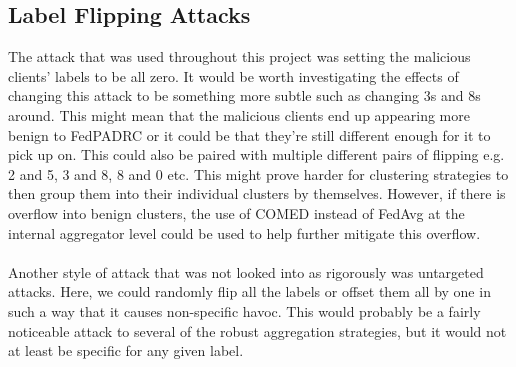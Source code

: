 \subsection{Label Flipping Attacks}
The attack that was used throughout this project was setting the malicious clients' labels to be all zero.
It would be worth investigating the effects of changing this attack to be something more subtle such as changing 3s and 8s around.
This might mean that the malicious clients end up appearing more benign to FedPADRC or it could be that they're still different enough for it to pick up on.
This could also be paired with multiple different pairs of flipping e.g. 2 and 5, 3 and 8, 8 and 0 etc.
This might prove harder for clustering strategies to then group them into their individual clusters by themselves.
However, if there is overflow into benign clusters, the use of COMED instead of FedAvg at the internal aggregator level could be used to help further mitigate this overflow.
\\ \\
Another style of attack that was not looked into as rigorously was untargeted attacks.
Here, we could randomly flip all the labels or offset them all by one in such a way that it causes non-specific havoc.
This would probably be a fairly noticeable attack to several of the robust aggregation strategies, but it would not at least be specific for any given label.


